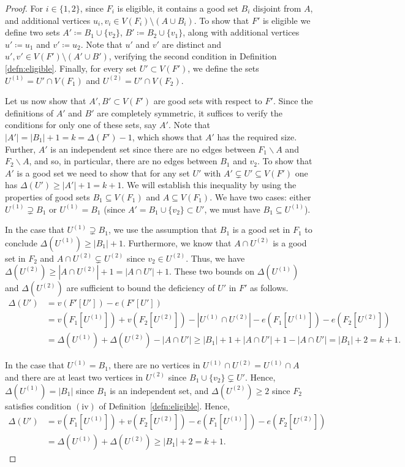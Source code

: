 \documentclass{daj}
\theoremstyle{plain}
\theoremstyle{remark}
\begin{document}
\begin{proof}
For $i\in \{1,2\}$, since $F_i$ is eligible, it contains a good set $B_i$ disjoint from $A$, and additional vertices $u_i, v_i \in V(F_i) \setminus (A\cup B_i)$. To show that $F'$ is eligible we define two sets $A' \coloneqq B_1\cup \{v_2\}$, $B'\coloneqq B_2\cup \{v_1\}$, along with additional vertices $u' \coloneqq u_1$ and $v' \coloneqq u_2$. Note that $u'$ and $v'$ are distinct and $u', v' \in V(F') \setminus (A' \cup B')$, verifying the second condition in Definition \ref{defn:eligible}. Finally, for every set $U'\subset V(F')$, we define the sets $U^{(1)}=U'\cap V(F_1)$ and $U^{(2)}=U'\cap V(F_2)$.

Let us now show that $A', B'\subset V(F')$ are good sets with respect to $F'$. Since the definitions of $A'$ and $B'$ are completely symmetric, it suffices to verify the conditions for only one of these sets, say $A'$. Note that $|A'|=|B_1|+1=k=\Delta(F')-1$, which shows that $A'$ has the required size. Further, $A'$ is an independent set since there are no edges between $F_1\backslash A$ and $F_2\backslash A$, and so, in particular, there are no edges between $B_1$ and $v_2$. To show that $A'$ is a good set we need to show that for any set $U'$ with $A'\subsetneq U'\subseteq V(F')$ one has $\Delta(U')\geq |A'|+1=k+1$. We will establish this inequality by using the properties of good sets $B_1\subseteq V(F_1)$ and $A\subseteq V(F_1)$. We have two cases: either $U^{(1)}\supsetneq B_1$ or $U^{(1)}=B_1$ (since $A'=B_1\cup \{v_2\}\subset U'$, we must have $B_1\subseteq U^{(1)}$). 

In the case that $U^{(1)}\supsetneq B_1$, we use the assumption that $B_1$ is a good set in $F_1$ to conclude $\Delta(U^{(1)})\geq |B_1|+1$. Furthermore, we know that $A\cap U^{(2)}$ is a good set in $F_2$ and $A\cap U^{(2)}\subsetneq U^{(2)}$ since $v_2\in U^{(2)}$. Thus, we have $\Delta(U^{(2)})\geq |A\cap U^{(2)}|+1 = |A\cap U'|+1$. These two bounds on $\Delta(U^{(1)})$ and $\Delta(U^{(2)})$ are sufficient to bound the deficiency of $U'$ in $F'$ as follows.
\begin{align*}
    \Delta(U')&=v(F'[U'])-e(F'[U']) \\ &=v(F_1[U^{(1)}])+v(F_2[U^{(2)}])-|U^{(1)}\cap U^{(2)}|-e(F_1[U^{(1)}])-e(F_2[U^{(2)}])\\
    &=\Delta(U^{(1)})+\Delta(U^{(2)})-|A\cap U'|\geq|B_1|+1+|A\cap U'|+1-|A\cap U'|=|B_1|+2=k+1.
\end{align*}

In the case that $U^{(1)}=B_1$, there are no vertices in $U^{(1)}\cap U^{(2)}=U^{(1)}\cap A$ and there are at least two vertices in $U^{(2)}$ since $B_1\cup \{v_2\}\subsetneq U'$. Hence, $\Delta(U^{(1)})=|B_1|$ since $B_1$ is an independent set, and $\Delta(U^{(2)})\geq 2$ since $F_2$ satisfies condition $\mathrm{(iv)}$ of Definition~\ref{defn:eligible}. Hence,
\begin{align*} \Delta(U') &=v(F_1[U^{(1)}])+v(F_2[U^{(2)}])-e(F_1[U^{(1)}])-e(F_2[U^{(2)}])\\
&=\Delta(U^{(1)})+\Delta(U^{(2)})\geq |B_1|+2=k+1.
\end{align*}


\end{proof}
\end{document}
